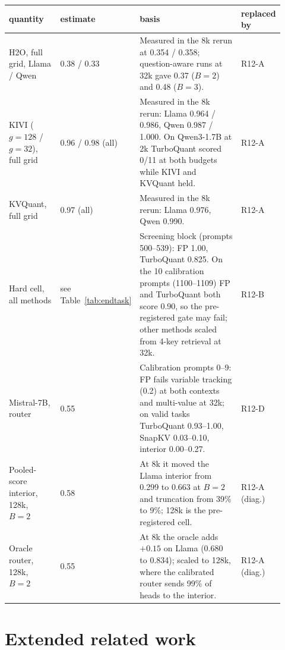 \begin{table}[h]
\centering
\scriptsize
\setlength{\tabcolsep}{3pt}
\begin{tabular}{@{}p{0.2\linewidth}p{0.13\linewidth}p{0.49\linewidth}p{0.1\linewidth}@{}}
\toprule
quantity & estimate & basis & replaced by \\
\midrule
H2O, full grid, Llama / Qwen & 0.38 / 0.33 & Measured in the 8k rerun at 0.354 / 0.358; question-aware runs at 32k gave 0.37 ($B=2$) and 0.48 ($B=3$). & R12-A \\
KIVI ($g{=}128$ / $g{=}32$), full grid & 0.96 / 0.98 (all) & Measured in the 8k rerun: Llama 0.964 / 0.986, Qwen 0.987 / 1.000.  On Qwen3-1.7B at 2k TurboQuant scored 0/11 at both budgets while KIVI and KVQuant held. & R12-A \\
KVQuant, full grid & 0.97 (all) & Measured in the 8k rerun: Llama 0.976, Qwen 0.990. & R12-A \\
Hard cell, all methods & see Table~\ref{tab:endtask} & Screening block (prompts 500--539): FP 1.00, TurboQuant 0.825.  On the 10 calibration prompts (1100--1109) FP and TurboQuant both score 0.90, so the pre-registered gate may fail; other methods scaled from 4-key retrieval at 32k. & R12-B \\
Mistral-7B, \sieve{} router & 0.55 & Calibration prompts 0--9: FP fails variable tracking (0.2) at both contexts and multi-value at 32k; on valid tasks TurboQuant 0.93--1.00, SnapKV 0.03--0.10, \sieve{} interior 0.00--0.27. & R12-D \\
Pooled-score interior, 128k, $B=2$ & 0.58 & At 8k it moved the Llama interior from 0.299 to 0.663 at $B=2$ and truncation from 39\% to 9\%; 128k is the pre-registered cell. & R12-A (diag.) \\
Oracle router, 128k, $B=2$ & 0.55 & At 8k the oracle adds $+0.15$ on Llama (0.680 to 0.834); scaled to 128k, where the calibrated router sends 99\% of heads to the interior. & R12-A (diag.) \\
\bottomrule
\end{tabular}
\end{table}


\section{Extended related work}
\label{app:related}

